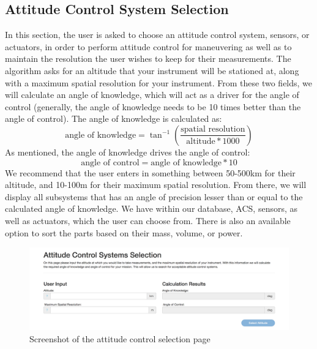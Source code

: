 \documentclass[a4, 12 pt]{article} %
\begin{document}
\subsection{Attitude Control System Selection}
In this section, the user is asked to choose an attitude control system, sensors, or actuators, in order to perform attitude control for maneuvering as well as to maintain the resolution the user wishes to keep for their measurements. The algorithm asks for an altitude that your instrument will be stationed at, along with a maximum spatial resolution for your instrument. From these two fields, we will calculate an angle of knowledge, which will act as a driver for the angle of control (generally, the angle of knowledge needs to be 10 times better than the angle of control). The angle of knowledge is calculated as:
\begin{equation} \text{angle of knowledge} = \tan^{-1}\left(\dfrac{\text{spatial resolution}}{\text{altitude} * 1000}\right)\end{equation}
As mentioned, the angle of knowledge drives the angle of control:
\begin{equation} \text{angle of control} = \text{angle of knowledge} * 10 \end{equation}
We recommend that the user enters in something between 50-500km for their altitude, and 10-100m for their maximum spatial resolution. From there, we will display all subsystems that has an angle of precision lesser than or equal to the calculated angle of knowledge. We have within our database, ACS, sensors, as well as actuators, which the user can choose from. There is also an available option to sort the parts based on their mass, volume, or power. 
\begin{figure}[H]
\begin{center}
\includegraphics[width=\linewidth]{3}
\caption{Screenshot of the attitude control selection page}
\label{default}
\end{center}
\end{figure}
\end{document}
